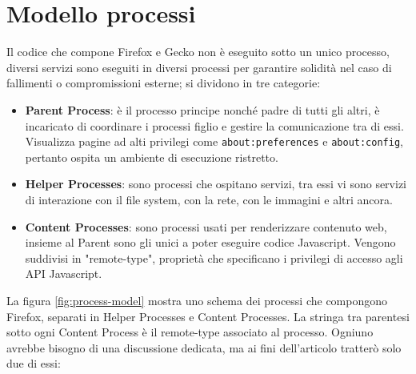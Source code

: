 \documentclass{sapthesis}
\newcommand{\code}[1]{\texttt{#1}}
\newcommand{\JS}{Javascript}
\begin{document}
    \section{Modello processi}
    \label{sec:modello-processi}
        Il codice che compone Firefox e Gecko non è eseguito sotto un unico processo, diversi servizi
        sono eseguiti in diversi processi per garantire solidità nel caso di fallimenti o 
        compromissioni esterne; si dividono in tre categorie:
        \begin{itemize}
            \item \textbf{Parent Process}: è il processo principe nonché padre di tutti gli altri,
                è incaricato di coordinare i processi figlio e gestire la comunicazione tra di essi.
                Visualizza pagine ad alti privilegi come \code{about:preferences} e \code{about:config},
                pertanto ospita un ambiente di esecuzione ristretto.

            \item \textbf{Helper Processes}: sono processi che ospitano servizi, tra essi vi sono servizi
                di interazione con il file system, con la rete, con le immagini e altri ancora.

            \item \textbf{Content Processes}: sono processi usati per renderizzare contenuto web, insieme
                al Parent sono gli unici a poter eseguire codice Javascript. Vengono suddivisi in 
                "remote-type", proprietà che specificano i privilegi di accesso agli API \JS{}.

        \end{itemize}
        La figura \ref{fig:process-model} mostra uno schema dei processi che compongono Firefox, separati in
        Helper Processes e Content Processes. La stringa tra parentesi sotto ogni Content Process è il
        remote-type associato al processo. Ogniuno avrebbe bisogno di una discussione dedicata,
        ma ai fini dell'articolo tratterò solo due di essi:
\end{document}
